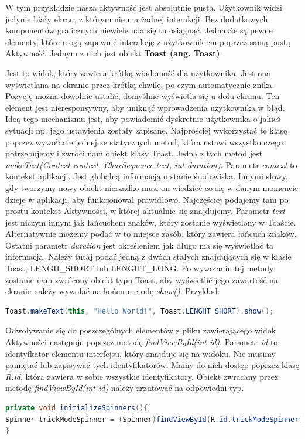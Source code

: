 W tym przykładzie nasza aktywność jest absolutnie pusta. Użytkownik widzi jedynie biały ekran, z którym nie ma żadnej interakcji. Bez dodatkowych komponentów graficznych niewiele uda się tu osiągnąć. Jednakże są pewne elementy, które mogą zapewnić interakcję z użytkownikiem poprzez samą pustą Aktywność. Jednym z nich jest obiekt \textbf{Toast (ang. Toast)}.\par Jest to widok, który zawiera krótką wiadomość dla użytkownika. Jest ona wyświetlana na ekranie przez krótką chwilę, po czym automatycznie znika. Pozycję można dowolnie ustalić, domyślnie wyświetla się u dołu ekranu. Ten element jest nieresponsywny, aby uniknąć wprowadzenia użytkownika w błąd. Ideą tego mechanizmu jest, aby powiadomić dyskretnie użytkownika o jakieś sytuacji np. jego ustawienia zostały zapisane. Najprościej wykorzystać tę klasę poprzez wywołanie jednej ze statycznych metod, która ustawi wszystko czego potrzebujemy i zwróci nam obiekt klasy Toast. Jedną z tych metod jest \textit{makeText(Context context, CharSequence text, int duration)}. Parametr \textit{context} to kontekst aplikacji. Jest globalną informacją o stanie środowiska. Innymi słowy, gdy tworzymy nowy obiekt nierzadko musi on wiedzieć co się w danym momencie dzieje w aplikacji, aby funkcjonował prawidłowo. Najczęściej podajemy tam po prostu kontekst Aktywności, w której aktualnie się znajdujemy. Parametr \textit{text} jest niczym innym jak łańcuchem znaków, który zostanie wyświetlony w Toaście. Alternatywnie możemy podać w to miejsce zasób, który zawiera łańcuch znaków. Ostatni parametr \textit{duration} jest określeniem jak długo ma się wyświetlać ta informacja. Należy tutaj podać jedną z dwóch stałych znajdujących się w klasie Toast, LENGH\_SHORT lub LENGHT\_LONG. Po wywołaniu tej metody zostanie nam zwrócony obiekt typu Toast, aby wyświetlić jego zawartość na ekranie należy wywołać na końcu metodę \textit{show()}.\cite{toast} Przykład:
\begin{lstlisting}[language=Java]
Toast.makeText(this, "Hello World!", Toast.LENGHT_SHORT).show();
\end{lstlisting}\par
Odwoływanie się do poszczególnych elementów z pliku zawierającego widok Aktywności następuje poprzez metodę \textit{findViewById(int id)}. Parametr \textit{id} to identyfkator elementu interfejsu, który znajduje się na widoku. Nie musimy pamiętać lub zapisywać tych identyfikatorów. Mamy do nich dostęp poprzez klasę \textit{R.id}, która zawiera w sobie wszystkie identyfikatory. Obiekt zwracany przez metodę \textit{findViewById(int id)} należy zrzutować na odpowiedni typ. \begin{lstlisting}[language=Java]
private void initializeSpinners(){
Spinner trickModeSpinner = (Spinner)findViewById(R.id.trickModeSpinner);
}
\end{lstlisting}
